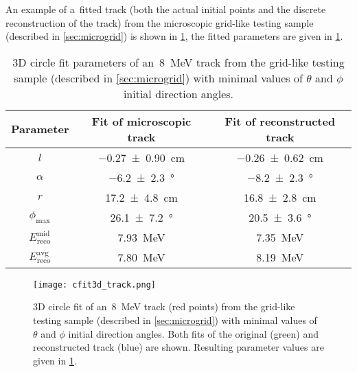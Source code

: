			An example of a~fitted track (both the actual initial points and the discrete reconstruction of the track) from the microscopic grid-like testing sample (described in \cref{sec:microgrid}) is shown in \cref{fig:cfit3d}, the fitted parameters are given in \cref{tab:cfit3d}.
			
			\begin{table}
				\centering
				{\renewcommand{\arraystretch}{1.2}
					\begin{tabular}{|c|c|c|}
						\hline
						\textbf{Parameter} & \textbf{Fit of microscopic track} & \textbf{Fit of reconstructed track} \\
						\hline
						$l$ & \qty{-0.27 \pm 0.90}{\cm} & \qty{-0.26 \pm 0.62}{\cm} \\ \hline
						$\alpha$ & \qty{-6.2 \pm 2.3}{\degree} & \qty{-8.2 \pm 2.3}{\degree} \\ \hline
						$r$ & \qty{17.2 \pm 4.8}{\cm} & \qty{16.8 \pm 2.8}{\cm} \\ \hline
						$\phi_{\text{max}}$ & \qty{26.1 \pm 7.2}{\degree} & \qty{20.5 \pm 3.6}{\degree} \\ \hline
						$E_{\text{reco}}^{\text{mid}}$ & \qty{7.93}{\MeV} & \qty{7.35}{\MeV} \\ \hline
						$E_{\text{reco}}^{\text{avg}}$ & \qty{7.80}{\MeV} & \qty{8.19}{\MeV} \\ \hline
				\end{tabular}}
				\caption{3D circle fit parameters of an~\qty{8}{\MeV} track from the grid-like testing sample (described in \cref{sec:microgrid}) with minimal values of $\theta$ and $\phi$ initial direction angles.}
				\label{tab:cfit3d}
			\end{table}
			
			\begin{figure}
				\centering
				\texttt{[image: cfit3d\_track.png]}
				\caption{3D circle fit of an~\qty{8}{\MeV} track (red points) from the grid-like testing sample (described in \cref{sec:microgrid}) with minimal values of $\theta$ and $\phi$ initial direction angles. Both fits of the original (green) and reconstructed track (blue) are shown. Resulting parameter values are given in \cref{tab:cfit3d}.}
				\label{fig:cfit3d}
			\end{figure}			
			
